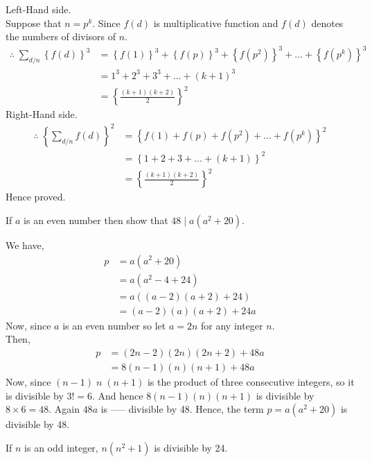 \documentclass[12pt]{book}
\begin{document}
\begin{soln}
    \hfill\newline
    Left-Hand side.\\
    Suppose that $ n=p^k $. Since $ f(d) $ is multiplicative function and $ f(d) $ denotes the numbers of divisors of $ n $.
    \begin{align*}
        \therefore\; \sum_{d/n}\left\{ f(d) \right\}^3&=\left\{ f(1) \right\}^3+\left\{ f(p) \right\}^3+\left\{ f(p^2) \right\}^3+\dots+\left\{ f(p^k) \right\}^3\\
        &=1^3+2^3+3^3+\dots+(k+1)^3\\
        &=\left\{ \frac{(k+1)(k+2)}{2} \right\}^2
    \end{align*}
    Right-Hand side.\\
    \begin{align*}
        \therefore\; \left\{\sum_{d/n} f(d) \right\}^2&=\left\{ f(1) +f(p)+f(p^2) +\dots+f(p^k) \right\}^2\\
        &=\left\{1+2+3+\dots+(k+1)\right\}^2\\
        &=\left\{ \frac{(k+1)(k+2)}{2} \right\}^2
    \end{align*}
    Hence proved.
\end{soln}
\begin{qn}
    If $ a $ is an even number then show that $ 48\mid a(a^2+20) $.
\end{qn}
\begin{soln}
    We have,
    \begin{align*}
        p&=a\left(a^2+20\right)\\
        &=a\left(a^2-4+24\right)\\
        &=a\left((a-2)(a+2)+24\right)\\
        &=(a-2)(a)(a+2)+24a
    \end{align*}
    Now, since $ a $ is an even number so let $ a=2n $ for any integer $ n $.\\
    Then, 
    \begin{align*}
        p&=(2n-2)(2n)(2n+2)+48a\\
        &=8(n-1)(n)(n+1)+48a
    \end{align*}
    Now, since $ (n-1)\;n\;(n+1) $ is the product of three consecutive integers, so it is divisible by $ 3!=6 $. And hence $ 8(n-1)(n)(n+1) $ is divisible by $ 8\times 6=48 $. Again $ 48a $ is ----- divisible by 48. Hence, the term $ p=a(a^2+20) $ is divisible by 48.
\end{soln}
\begin{qn}
    If $ n $ is an odd integer, $ n(n^2+1) $ is divisible by 24.
\end{qn}
\end{document}

